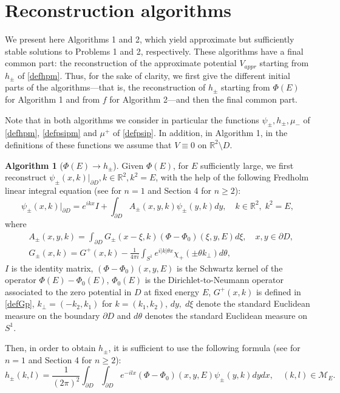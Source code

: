 \documentclass[11pt,a4paper,english,subeqn]{amsart}
\theoremstyle{plain}
\theoremstyle{definition}
\newtheorem{algo}{Algorithm}
\numberwithin{equation}{section}
\begin{document}
\section{Reconstruction algorithms} \label{secalg}
We present here Algorithms 1 and 2, which yield approximate but sufficiently stable solutions to Problems 1 and 2, respectively. These algorithms have a final common part: the reconstruction of the approximate potential $V_{appr}$ starting from $h_{\pm}$ of \eqref{defhpm}. Thus, for the sake of clarity, we first give the different initial parts of the algorithms---that is, the reconstruction of $h_{\pm}$ starting from $\Phi(E)$ for Algorithm 1 and from $f$ for Algorithm 2---and then the final common part.

Note that in both algorithms we consider in particular the functions $\psi_{\pm}, h_{\pm}, \mu_-$ of \eqref{defhpm}, \eqref{defpsipm} and $\mu^+$ of \eqref{defpsip}. In addition, in Algorithm 1, in the definitions of these functions we assume that $V \equiv 0$ on ${\mathbb{R}}^2 \setminus D$.

\begin{algo}[$\Phi(E) \longrightarrow h_{\pm}$]
Given $\Phi(E)$, for $E$ sufficiently large, we first reconstruct $\psi_{\pm}(x,k)|_{\partial D},k \in {\mathbb{R}}^2, k^2 =E$, with the help of the following Fredholm linear integral equation (see \cite{N1} for $n=1$ and Section 4 for $n\geq 2$):
\begin{equation}\label{eq11}
\psi_{\pm}(x,k)|_{\partial D}=e^{ikx}I+\int_{\partial D}A_{\pm}(x,y,k)\psi_{\pm}(y,k) dy, \quad k \in {\mathbb{R}}^2, \; k^2 = E,
\end{equation}
where
\begin{align} \label{eq12}
&A_{\pm}(x,y,k)=\int_{\partial D} G_{\pm}(x-\xi,k) \left(\Phi - \Phi_0 \right)(\xi,y,E) d\xi, \quad x,y \in \partial D, \\ \label{eq13}
&G_{\pm}(x,k) =G^+(x,k) - \frac{1}{4 \pi i} \int_{S^1}e^{i|k|\theta x}\chi_+(\pm \theta k_{\bot}) d\theta,
\end{align}
$I$ is the identity matrix, $(\Phi-\Phi_0)(x,y,E)$ is the Schwartz kernel of the operator $\Phi(E)-\Phi_0(E)$, $\Phi_0(E)$ is the Dirichlet-to-Neumann operator associated to the zero potential in $D$ at fixed energy $E$, $G^+(x,k)$ is defined in \eqref{defGp}, $k_{\bot}= (-k_2, k_1)$ for $k = (k_1,k_2)$, $dy, \; d \xi$ denote the standard Euclidean measure on the boundary $\partial D$ and $d\theta$ denotes the standard Euclidean measure on $S^1$.

Then, in order to obtain $h_{\pm}$, it is sufficient to use the following formula (see \cite{N1} for $n=1$ and Section 4 for $n\geq 2$):
\begin{equation} \label{rech}
h_{\pm}(k,l) = \frac{1}{(2 \pi)^2} \int_{\partial D} \int_{\partial D}e^{-ilx}(\Phi-\Phi_0)(x,y,E)\psi_{\pm}(y,k)dy dx, \quad (k,l) \in {\mathscr{M}_E}.
\end{equation}
\end{algo}
\end{document}
